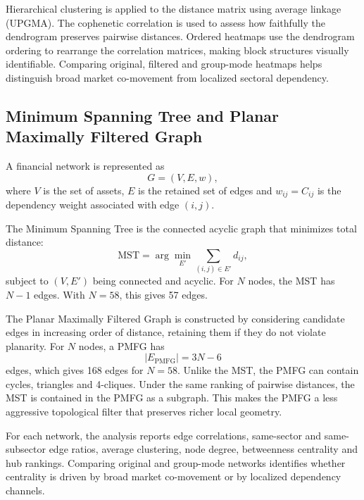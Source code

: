 Hierarchical clustering is applied to the distance matrix using average linkage (UPGMA). The cophenetic correlation \cite{sokal_rohlf_1962} is used to assess how faithfully the dendrogram preserves pairwise distances. Ordered heatmaps use the dendrogram ordering to rearrange the correlation matrices, making block structures visually identifiable. Comparing original, filtered and group-mode heatmaps helps distinguish broad market co-movement from localized sectoral dependency.

\subsection{Minimum Spanning Tree and Planar Maximally Filtered Graph}
\label{subsec:network_method}

A financial network is represented as
\begin{equation}
G=(V,E,w),
\end{equation}
where $V$ is the set of assets, $E$ is the retained set of edges and $w_{ij}=C_{ij}$ is the dependency weight associated with edge $(i,j)$.

The Minimum Spanning Tree is the connected acyclic graph that minimizes total distance:
\begin{equation}
\mathrm{MST}
=
\arg\min_{E'}
\sum_{(i,j)\in E'}
d_{ij},
\end{equation}
subject to $(V,E')$ being connected and acyclic. For $N$ nodes, the MST has $N-1$ edges. With $N=58$, this gives 57 edges.

The Planar Maximally Filtered Graph is constructed by considering candidate edges in increasing order of distance, retaining them if they do not violate planarity. For $N$ nodes, a PMFG has
\begin{equation}
|E_{\mathrm{PMFG}}|
=
3N-6
\end{equation}
edges, which gives 168 edges for $N=58$. Unlike the MST, the PMFG can contain cycles, triangles and 4-cliques. Under the same ranking of pairwise distances, the MST is contained in the PMFG as a subgraph. This makes the PMFG a less aggressive topological filter that preserves richer local geometry.

For each network, the analysis reports edge correlations, same-sector and same-subsector edge ratios, average clustering, node degree, betweenness centrality and hub rankings. Comparing original and group-mode networks identifies whether centrality is driven by broad market co-movement or by localized dependency channels.

